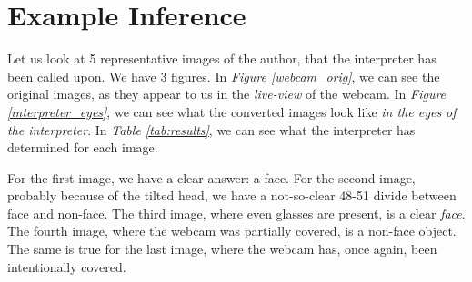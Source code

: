 \newpage
\section{Example Inference}
Let us look at 5 representative images of the author, that the interpreter has been called upon. We have 3 figures. In \textit{Figure \ref{webcam_orig}}, we can see the original images, as they appear to us in the \textit{live-view} of the webcam. In \textit{Figure \ref{interpreter_eyes}}, we can see what the converted images look like \textit{in the eyes of the interpreter}. In \textit{Table \ref{tab:results}}, we can see what the interpreter has determined for each image. \par
For the first image, we have a clear answer: a face. For the second image, probably because of the tilted head, we have a not-so-clear 48-51 divide between face and non-face. The third image, where even glasses are present, is a clear \textit{face}. The fourth image, where the webcam was partially covered, is a non-face object. The same is true for the last image, where the webcam has, once again, been intentionally covered.

